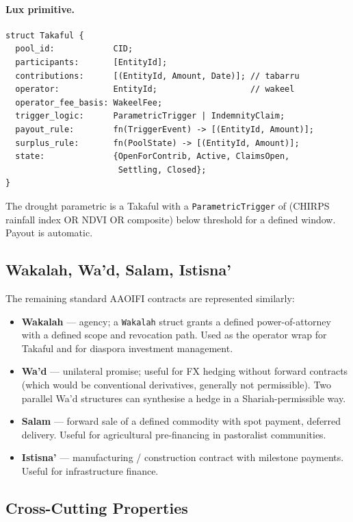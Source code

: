 \documentclass[11pt,letterpaper]{article}
\begin{document}
\paragraph{Lux primitive.}
\begin{verbatim}
struct Takaful {
  pool_id:            CID;
  participants:       [EntityId];
  contributions:      [(EntityId, Amount, Date)]; // tabarru
  operator:           EntityId;                   // wakeel
  operator_fee_basis: WakeelFee;
  trigger_logic:      ParametricTrigger | IndemnityClaim;
  payout_rule:        fn(TriggerEvent) -> [(EntityId, Amount)];
  surplus_rule:       fn(PoolState) -> [(EntityId, Amount)];
  state:              {OpenForContrib, Active, ClaimsOpen,
                       Settling, Closed};
}
\end{verbatim}

The drought parametric is a Takaful with a \texttt{ParametricTrigger}
of (CHIRPS rainfall index OR NDVI OR composite) below threshold for a
defined window. Payout is automatic.

\subsection{Wakalah, Wa'd, Salam, Istisna'}
The remaining standard AAOIFI contracts are represented similarly:

\begin{itemize}[leftmargin=1.6em]
  \item \textbf{Wakalah} --- agency; a \texttt{Wakalah} struct grants
        a defined power-of-attorney with a defined scope and revocation
        path. Used as the operator wrap for Takaful and for diaspora
        investment management.
  \item \textbf{Wa'd} --- unilateral promise; useful for FX hedging
        without forward contracts (which would be conventional
        derivatives, generally not permissible). Two parallel Wa'd
        structures can synthesise a hedge in a Shariah-permissible way.
  \item \textbf{Salam} --- forward sale of a defined commodity with
        spot payment, deferred delivery. Useful for agricultural
        pre-financing in pastoralist communities.
  \item \textbf{Istisna'} --- manufacturing / construction contract
        with milestone payments. Useful for infrastructure finance.
\end{itemize}

\subsection{Cross-Cutting Properties}
\end{document}
